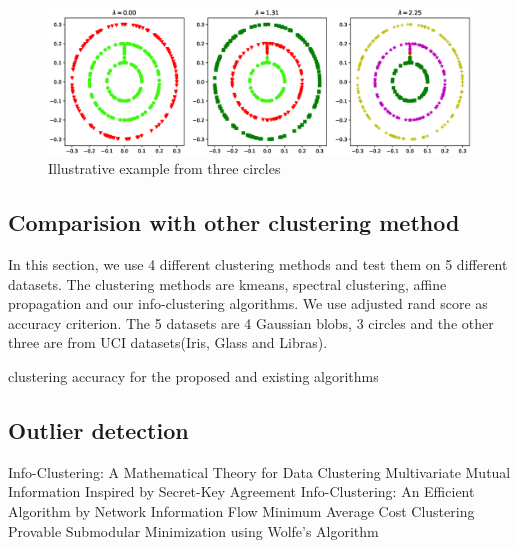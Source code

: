 \documentclass{article}
\begin{document}
\begin{figure}[!ht]
\includegraphics[width=12cm]{pic/3circle.eps}
\caption{Illustrative example from three circles}\label{fig:3c}
\end{figure}
\subsection{Comparision with other clustering method}
In this section, we use 4 different clustering methods and test them on 5 different datasets. The clustering methods are kmeans, spectral clustering, affine propagation and our info-clustering algorithms. We use adjusted rand score as accuracy criterion. The 5 datasets are 4 Gaussian blobs, 3 circles and the other three are from UCI datasets(Iris, Glass and Libras).
\begin{table}[!ht]
\centering
{}
\caption{clustering accuracy for the proposed and existing algorithms}
\end{table}
\subsection{Outlier detection}
\begin{thebibliography}{9}
Info-Clustering: A Mathematical Theory for Data Clustering
 Multivariate Mutual Information Inspired by Secret-Key Agreement
 Info-Clustering: An Efficient Algorithm by Network Information Flow
 Minimum Average Cost Clustering
 Provable Submodular Minimization using Wolfe's Algorithm
\end{thebibliography}
\end{document}
